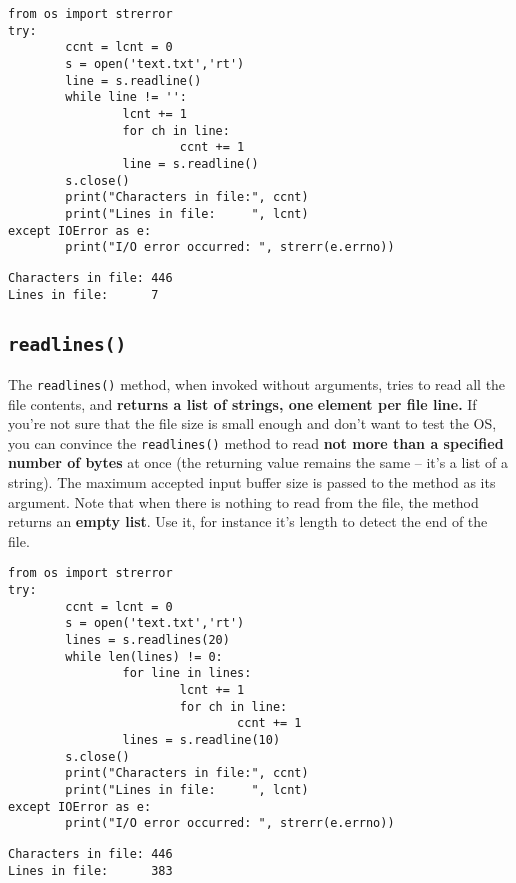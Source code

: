 \documentclass[11pt]{article}
\begin{document}
\begin{verbatim}
from os import strerror
try:
        ccnt = lcnt = 0
        s = open('text.txt','rt')
        line = s.readline()
        while line != '':
                lcnt += 1
                for ch in line:
                        ccnt += 1
                line = s.readline()
        s.close()
        print("Characters in file:", ccnt)
        print("Lines in file:     ", lcnt)
except IOError as e:
        print("I/O error occurred: ", strerr(e.errno))
\end{verbatim}

\begin{verbatim}
Characters in file: 446
Lines in file:      7
\end{verbatim}

\subsection{\texttt{readlines()}}
\label{sec:org0f622c3}
The \texttt{readlines()} method, when invoked without arguments, tries to
read all the file contents, and \textbf{returns a list of strings, one}
\textbf{element per file line.} If you’re not sure that the file size is
small enough and don’t want to test the OS, you can convince the
\texttt{readlines()} method to read \textbf{not more than a specified number of
bytes} at once (the returning value remains the same – it’s a list of
a string).  The maximum accepted input buffer size is passed to the
method as its argument. Note that when there is nothing to read from
the file, the method returns an \textbf{empty list}. Use it, for instance
it's length to detect the end of the file.


\begin{verbatim}
from os import strerror
try:
        ccnt = lcnt = 0
        s = open('text.txt','rt')
        lines = s.readlines(20)
        while len(lines) != 0:
                for line in lines:
                        lcnt += 1
                        for ch in line:
                                ccnt += 1
                lines = s.readline(10)
        s.close()
        print("Characters in file:", ccnt)
        print("Lines in file:     ", lcnt)
except IOError as e:
        print("I/O error occurred: ", strerr(e.errno))
\end{verbatim}

\begin{verbatim}
Characters in file: 446
Lines in file:      383
\end{verbatim}
\end{document}
